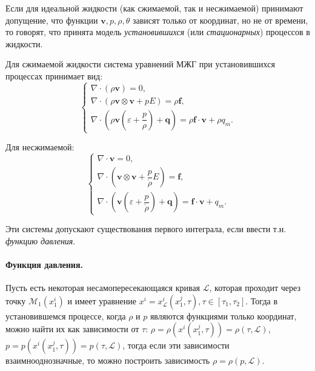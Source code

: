 
\begin{definition}
  Если для идеальной жидкости (как сжимаемой, так и несжимаемой) принимают допущение,
  что функции $\mathbf{v}, p, \rho, \theta$ зависят только от координат, но не от времени, то
  говорят, что принята модель \emph{установившихся} (или \emph{стационарных}) процессов в
  жидкости.
\end{definition}

Для сжимаемой жидкости система уравнений МЖГ при установившихся процессах принимает вид:
\[
  \begin{cases}
    \nabla \cdot (\rho \mathbf{v}) = 0, \\
    \nabla \cdot \left( \rho \mathbf{v} \otimes \mathbf{v} + p E \right) = \rho \mathbf{f}, \\
    \nabla \cdot \left( \rho \mathbf{v} (\varepsilon + \dfrac{p}{\rho}) + \mathbf{q} \right) = \rho \mathbf{f} \cdot \mathbf{v} + \rho q_m.
  \end{cases}
\]

Для несжимаемой:
\[
  \begin{cases}
    \nabla \cdot \mathbf{v} = 0, \\
    \nabla \cdot \left( \mathbf{v} \otimes \mathbf{v} + \dfrac{p}{\mathring{\rho}} E \right) = \mathbf{f}, \\
    \nabla \cdot \left( \mathbf{v} \left( \varepsilon + \dfrac{p}{\mathring{\rho}} \right) + \mathbf{q} \right) = \mathbf{f} \cdot \mathbf{v} + q_m.
  \end{cases}
\]

Эти системы допускают существования первого интеграла, если ввести т.н. \emph{функцию давления}.

\paragraph{Функция давления.}
Пусть есть некоторая несамопересекающаяся кривая $\mathcal{L}$, которая проходит через
точку $\mathcal{M}_1 ( x^i_1 )$ и имеет уравнение
$x^i = x^i_\mathcal{L} (x^j_1, \tau), \tau \in [\tau_1, \tau_2]$. Тогда в установившемся
процессе, когда $\rho$ и $p$ являются функциями только координат, можно найти их как
зависимости от $\tau$: $\rho = \rho(x^i(x^j_1, \tau)) = \rho(\tau, \mathcal{L})$,
$p = p(x^i(x^j_1, \tau)) = p(\tau, \mathcal{L})$, тогда если эти зависимости взаимнооднозначные,
то можно построить зависимость $\rho = \rho(p, \mathcal{L})$.

